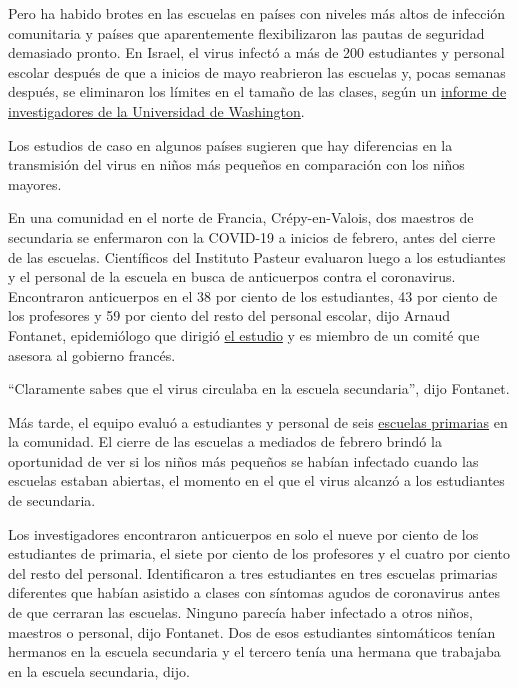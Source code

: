 Pero ha habido brotes en las escuelas en países con niveles más altos de
infección comunitaria y países que aparentemente flexibilizaron las
pautas de seguridad demasiado pronto. En Israel, el virus infectó a más
de 200 estudiantes y personal escolar después de que a inicios de mayo
reabrieron las escuelas y, pocas semanas después, se eliminaron los
límites en el tamaño de las clases, según un
\href{https://globalhealth.washington.edu/sites/default/files/COVID-19\%20Schools\%20Summary\%20\%282\%29.pdf?mkt_tok=eyJpIjoiTkRreE5XWXlORFF3TXpNeCIsInQiOiJIbVNQTTVySEo0Vzk1cHVBZVVqWnFGVmR1UEJxRGdpd01mTXg4OGw3Mk5nTnpmaUoyMGt2UXIwWVZBOE5GVjIybHA5aStrbzJ3MUxsanoxamZibmlocmpSbXZyVFVoV0VHYU1aTGx0RnpsMXlmOEtXSVJqaDJsZ0RJU1BQcVZjZSJ9}{informe
de investigadores de la Universidad de Washington}.

Los estudios de caso en algunos países sugieren que hay diferencias en
la transmisión del virus en niños más pequeños en comparación con los
niños mayores.

En una comunidad en el norte de Francia, Crépy-en-Valois, dos maestros
de secundaria se enfermaron con la COVID-19 a inicios de febrero, antes
del cierre de las escuelas. Científicos del Instituto Pasteur evaluaron
luego a los estudiantes y el personal de la escuela en busca de
anticuerpos contra el coronavirus. Encontraron anticuerpos en el 38 por
ciento de los estudiantes, 43 por ciento de los profesores y 59 por
ciento del resto del personal escolar, dijo Arnaud Fontanet,
epidemiólogo que dirigió
\href{https://www.medrxiv.org/content/10.1101/2020.04.18.20071134v1}{el
estudio} y es miembro de un comité que asesora al gobierno francés.

``Claramente sabes que el virus circulaba en la escuela secundaria'',
dijo Fontanet.

Más tarde, el equipo evaluó a estudiantes y personal de seis
\href{https://www.medrxiv.org/content/10.1101/2020.06.25.20140178v2}{escuelas
primarias} en la comunidad. El cierre de las escuelas a mediados de
febrero brindó la oportunidad de ver si los niños más pequeños se habían
infectado cuando las escuelas estaban abiertas, el momento en el que el
virus alcanzó a los estudiantes de secundaria.

Los investigadores encontraron anticuerpos en solo el nueve por ciento
de los estudiantes de primaria, el siete por ciento de los profesores y
el cuatro por ciento del resto del personal. Identificaron a tres
estudiantes en tres escuelas primarias diferentes que habían asistido a
clases con síntomas agudos de coronavirus antes de que cerraran las
escuelas. Ninguno parecía haber infectado a otros niños, maestros o
personal, dijo Fontanet. Dos de esos estudiantes sintomáticos tenían
hermanos en la escuela secundaria y el tercero tenía una hermana que
trabajaba en la escuela secundaria, dijo.

